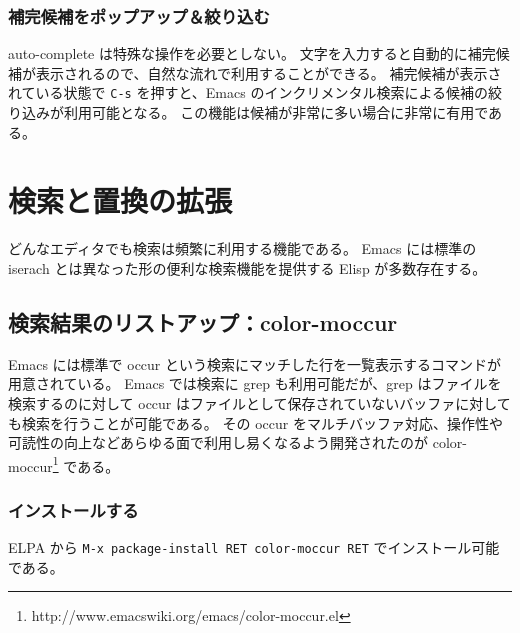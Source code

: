 \subsubsection{補完候補をポップアップ＆絞り込む}
auto-complete は特殊な操作を必要としない。
文字を入力すると自動的に補完候補が表示されるので、自然な流れで利用することができる。
補完候補が表示されている状態で \texttt{C-s} を押すと、Emacs のインクリメンタル検索による候補の絞り込みが利用可能となる。
この機能は候補が非常に多い場合に非常に有用である。
\section{検索と置換の拡張}
どんなエディタでも検索は頻繁に利用する機能である。
Emacs には標準の iserach とは異なった形の便利な検索機能を提供する Elisp が多数存在する。
\subsection{検索結果のリストアップ：color-moccur}
Emacs には標準で occur という検索にマッチした行を一覧表示するコマンドが用意されている。
Emacs では検索に grep も利用可能だが、grep はファイルを検索するのに対して occur はファイルとして保存されていないバッファに対しても検索を行うことが可能である。
その occur をマルチバッファ対応、操作性や可読性の向上などあらゆる面で利用し易くなるよう開発されたのが color-moccur\footnote{http://www.emacswiki.org/emacs/color-moccur.el} である。
\subsubsection{インストールする}
ELPA から \texttt{M-x package-install RET color-moccur RET} でインストール可能である。
